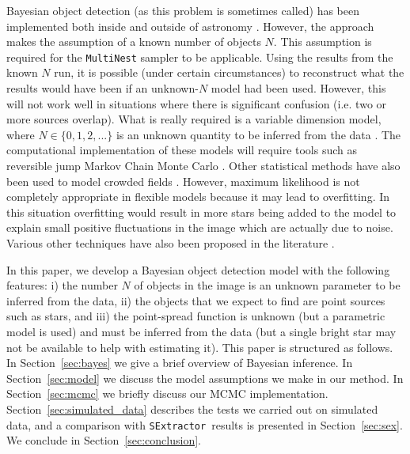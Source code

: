 \documentclass[12pt, preprint]{aastex}
\newcommand{\sex}{{\tt SExtractor}}
\begin{document}
Bayesian object detection (as this problem is sometimes called) has been
implemented both inside and outside of astronomy
\citep[e.g.][]{object, 2003MNRAS.338..765H, 2011MNRAS.415.3462F}. However, the
\citet{2011MNRAS.415.3462F} approach makes the assumption of a
known number of objects $N$.
This assumption is required for the
{\tt MultiNest} sampler \citep{multinest} to be applicable.
Using the results from the known $N$
run, it is possible (under certain circumstances) to reconstruct what the
results would have been if an unknown-$N$ model had been used. However,
this will not work well in situations where there is significant confusion
(i.e. two or more sources overlap). What is really required is a variable
dimension model, where $N \in \{0, 1, 2, ... \}$ is an unknown quantity to be
inferred from the data \citep[e.g.][]{2003MNRAS.338..765H}.
The computational implementation of these models will require tools such as
reversible jump Markov Chain Monte Carlo \citep{rjmcmc}. Other statistical
methods have also been used to model crowded fields
\citep[e.g. maximum likelihood,][]{irwin}.
However, maximum likelihood is not completely appropriate in flexible models
because it may lead to overfitting. In this situation overfitting would result
in more stars being added to the model to explain small positive fluctuations
in the image which are actually due to noise. Various other techniques have
also been proposed in the literature
\citep[e.g.][]{2002MNRAS.335...73M, 2007A&A...461..373M, 2009PASP..121.1429Z}.

In this paper, we develop a Bayesian object detection model with the following
features: i) the number $N$ of objects in the image is an unknown parameter
to be inferred from the data, ii) the objects that we expect to find are point sources such
as stars, and iii) the point-spread function is unknown (but a parametric model is
used) and must be inferred from
the data (but a single bright star may not be available to help with estimating it).
This paper is structured as follows. In Section~\ref{sec:bayes}
we give a brief overview of Bayesian inference. In Section~\ref{sec:model} we
discuss the model assumptions we make in our method. In Section~\ref{sec:mcmc}
we briefly discuss our
MCMC implementation. Section~\ref{sec:simulated_data} describes the tests we
carried out on simulated data, and a comparison with \sex~results is presented
in Section~\ref{sec:sex}. We conclude in Section~\ref{sec:conclusion}.
\end{document}
